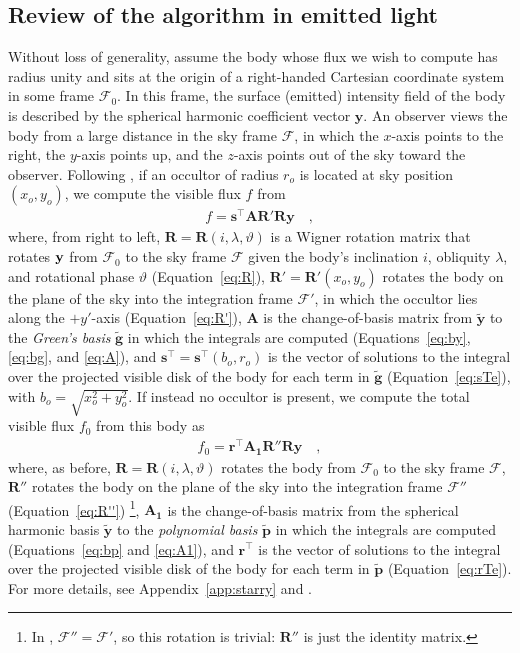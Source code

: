 \documentclass[modern]{aastex62}
\newcommand{\BF}[1]{\ensuremath{\mathbf{#1}}}
\newcommand{\sTe}{\ensuremath{\BF{s}^\top}}
\newcommand{\rTe}{\ensuremath{\BF{r}^\top}}
\newcommand{\bg}{\ensuremath{\tilde{\BF{g}}}}
\newcommand{\bp}{\ensuremath{\tilde{\BF{p}}}}
\newcommand{\by}{\ensuremath{\tilde{\BF{y}}}}
\begin{document}
\subsection{Review of the \starry algorithm in emitted light}
\label{sec:starry-review}
%
Without loss of generality, assume the body whose flux we wish to compute
has radius unity and sits at the origin of a right-handed Cartesian coordinate
system in some frame $\mathcal{F}_0$. In this frame,
the surface (emitted) intensity field of the body is described by the
spherical harmonic coefficient vector $\mathbf{y}$.
An observer views the body from a large distance in the sky frame
$\mathcal{F}$, in which the $x$-axis points to the right,
the $y$-axis points up, and the $z$-axis points out of the sky
toward the observer. Following \citet{Luger2019}, if
an occultor of radius $r_o$ is located at sky position $(x_o, y_o)$,
we compute the visible flux $f$ from
%
\begin{align}
    \label{eq:sTARRy}
    f = \sTe \BF{A} \BF{R}' \BF{R} \BF{y}
    \quad,
\end{align}
%
where, from right to left, $\BF{R} = \BF{R}(i, \lambda, \vartheta)$
is a Wigner rotation matrix that rotates ${\mathbf{y}}$ from $\mathcal{F}_0$
to the sky frame $\mathcal{F}$
given the body's inclination $i$, obliquity
$\lambda$, and rotational phase $\vartheta$ (Equation~\ref{eq:R}),
%
$\BF{R}' = \BF{R}'(x_o, y_o)$ rotates the body on the plane
of the sky into the integration frame $\mathcal{F}'$, in which the
occultor lies along the $+y'$-axis (Equation~\ref{eq:R'}),
%
$\BF{A}$ is the change-of-basis matrix from $\by$
to the \emph{Green's basis} $\bg$ in which the integrals are computed
(Equations~\ref{eq:by}, \ref{eq:bg}, and \ref{eq:A}),
%
and $\sTe = \sTe(b_o, r_o)$ is the vector of solutions to the integral over
the projected visible disk of the body for each term in $\bg$
(Equation~\ref{eq:sTe}), with $b_o = \sqrt{x_o^2 + y_o^2}$.
%
If instead no occultor is present, we compute the total
visible flux $f_0$ from this body as
%
\begin{align}
    \label{eq:rTA1Ry}
    f_0 = \rTe \BF{A_1} \BF{R}'' \BF{R} \BF{y}
    \quad,
\end{align}
%
where, as before, $\BF{R} = \BF{R}(i, \lambda, \vartheta)$
rotates the body from $\mathcal{F}_0$
to the sky frame $\mathcal{F}$,
%
$\BF{R}''$ rotates the body on the plane
of the sky into the integration frame
$\mathcal{F}''$ (Equation~\ref{eq:R''})%
\footnote{%
    In \citet{Luger2019}, $\mathcal{F}'' = \mathcal{F}'$, so
    this rotation is trivial: $\BF{R}''$ is just the identity matrix.
},
%
$\BF{A_1}$ is the change-of-basis matrix from the spherical harmonic
basis $\by$ to the \emph{polynomial basis} $\bp$ in which the integrals
are computed (Equations~\ref{eq:bp} and \ref{eq:A1}),
%
and $\rTe$ is the vector of solutions to the integral over
the projected visible disk of the body for each term in $\bp$
(Equation~\ref{eq:rTe}).
%
For more details, see Appendix~\ref{app:starry} and \citet{Luger2019}.
\end{document}
